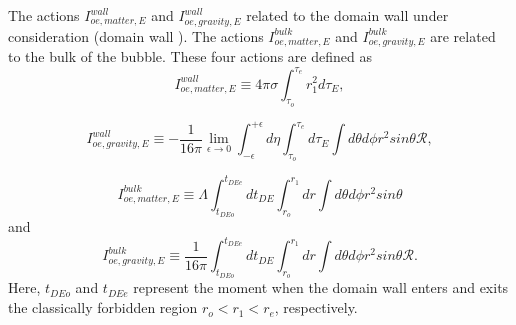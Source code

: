 \documentclass[12pt]{article}
\begin{document}
The actions $I^{wall}_{oe,matter,E}$ and $I^{wall}_{oe,gravity,E}$ related to the domain wall under consideration (domain wall \uppercase\expandafter{}). The actions $I^{bulk}_{oe,matter,E}$ and $I^{bulk}_{oe,gravity,E}$ are related to the bulk of the bubble. These four actions  are defined as
\begin{equation}
\label{eq:3.21}%
I^{wall}_{oe,matter,E}\equiv 4\pi\sigma \int_{\tau_{o}}^{\tau_{e}}r_{1}^{2}d\tau_{E},
\end{equation}

\begin{equation}
\label{eq:3.22}%
I^{wall}_{oe,gravity,E}\equiv -\frac{1}{16\pi}\lim_{\epsilon\rightarrow0}\int_{-\epsilon}^{+\epsilon}d\eta\int_{\tau_{o}}^{\tau_{e}}d\tau_{E}\int d\theta d\phi r^{2}sin \theta\mathscr{R},
\end{equation}

\begin{equation}
\label{eq:3.23}%
I^{bulk}_{oe,matter,E}\equiv\Lambda\int_{t_{DEo}}^{t_{DEe}}dt_{DE}\int_{r_{o}}^{r_{1}}dr\int d\theta d\phi r^{2}sin \theta
\end{equation}
and
\begin{equation}
\label{eq:3.24}%
I^{bulk}_{oe,gravity,E}\equiv \frac{1}{16\pi}\int_{t_{DEo}}^{t_{DEe}}dt_{DE}\int_{r_{o}}^{r_{1}}dr\int d\theta d\phi r^{2}sin \theta\mathscr{R}.
\end{equation}
Here, $t_{DEo}$ and $t_{DEe}$ represent the moment when the domain wall enters and exits the classically forbidden region $r_{o}<r_{1}<r_{e}$, respectively.
\end{document}
